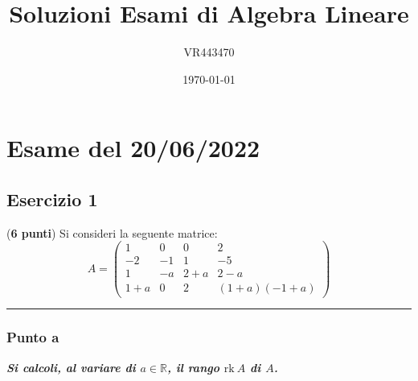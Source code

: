 \documentclass[a4paper]{article}
\newcommand{\longline}{\noindent\rule{\textwidth}{0.4pt}}
\begin{document}
	\author{VR443470}
	\title{Soluzioni Esami di Algebra Lineare}
	\date{\printdayoff\today}
	\maketitle
	
	\newpage
	
	\tableofcontents
	
	\newpage
	
	\section{Esame del 20/06/2022}
	
	\subsection{Esercizio 1}
	
	(\textbf{6 punti}) Si consideri la seguente matrice:
	\begin{equation*}
		A = \begin{pmatrix}
			1	& 0		& 0		& 2 \\
			-2	& -1	& 1		& -5 \\
			1	& -a	& 2+a	& 2-a \\
			1+a	& 0		& 2		& \left(1+a\right)\left(-1+a\right)
		\end{pmatrix}
	\end{equation*}
	
	\longline
	
	\subsubsection{Punto a}
	
	\textcolor{Green4}{\emph{\textbf{Si calcoli, al variare di $a \in \mathbb{R}$, il rango $\mathrm{rk} \: A$ di $A$.}}}\newline
	
\end{document}
